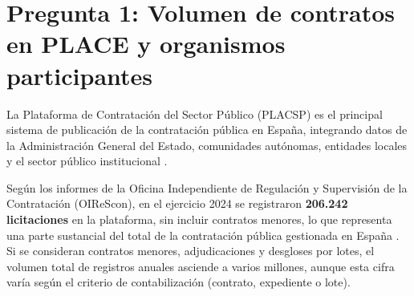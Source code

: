 \documentclass[11pt,a4paper,spanish]{book}
\numberwithin{equation}{chapter}
\numberwithin{figure}{chapter}
\begin{document}



\section{Pregunta 1: Volumen de contratos en PLACE y organismos participantes}

La Plataforma de Contrataci{\'o}n del Sector P{\'u}blico (PLACSP) es el principal sistema de publicaci{\'o}n de la contrataci{\'o}n p{\'u}blica en Espa{\~n}a, integrando datos de la Administraci{\'o}n General del Estado, comunidades aut{\'o}nomas, entidades locales y el sector p{\'u}blico institucional \cite{MinHacienda2024PLACE}.

Seg{\'u}n los informes de la Oficina Independiente de Regulaci{\'o}n y Supervisi{\'o}n de la Contrataci{\'o}n (OIReScon), en el ejercicio 2024 se registraron \textbf{206.242 licitaciones} en la plataforma, sin incluir contratos menores, lo que representa una parte sustancial del total de la contrataci{\'o}n p{\'u}blica gestionada en Espa{\~n}a \cite{OIReScon2025}. Si se consideran contratos menores, adjudicaciones y desgloses por lotes, el volumen total de registros anuales asciende a varios millones, aunque esta cifra var{\'i}a seg{\'u}n el criterio de contabilizaci{\'o}n (contrato, expediente o lote).
\end{document}
